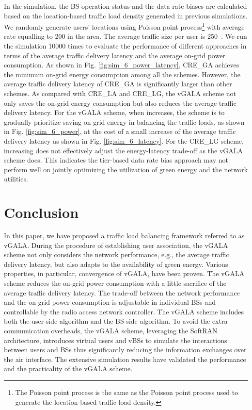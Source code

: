 \documentclass[journal]{IEEEtran}
\theoremstyle{definition}
\begin{document}
In the simulation, the BS operation status and the data rate biases are calculated based on the location-based traffic load density generated in previous simulations. We randomly generate users' locations using Poisson point process\footnote{The Poisson point process is the same as the Poisson point process used to generate the location-based traffic load density.} with average rate equalling to 200 in the area. The average traffic size per user is 250~. We run the simulation 10000 times to evaluate the performance of different approaches in terms of the average traffic delivery latency and the average on-grid power consumption. As shown in Fig. \ref{fig:sim_6_power_latency}, CRE\_GA achieves the minimum on-grid energy consumption among all the schemes. However, the average traffic delivery latency of CRE\_GA is significantly larger than other schemes. As compared with CRE\_LA and CRE\_LG, the vGALA scheme not only saves the on-grid energy consumption but also reduces the average traffic delivery latency. For the vGALA scheme, when  increases, the scheme is to gradually prioritize saving on-grid energy in balancing the traffic loads, as shown in Fig. \ref{fig:sim_6_power}, at the cost of a small increase of the average traffic delivery latency as shown in Fig. \ref{fig:sim_6_latency}. For the CRE\_LG scheme, increasing  does not effectively adjust the energy-latency trade-off as the vGALA scheme does. This indicates the tier-based data rate bias approach may not perform well on jointly optimizing the utilization of green energy and the network utilities.






\section{Conclusion}
\label{sec:conclusion}
In this paper, we have proposed a traffic load balancing framework referred to as vGALA. During the procedure of establishing user association, the vGALA scheme not only considers the network performance, e.g., the average traffic delivery latency, but also adapts to the availability of green energy. Various properties, in particular, convergence of vGALA, have been proven. The vGALA scheme reduces the on-grid power consumption with a little sacrifice of the average traffic delivery latency. The trade-off between the network performance and the on-grid power consumption is adjustable in individual BSs and controllable by the radio access network controller. The vGALA scheme includes both the user side algorithm and the BS side algorithm. To avoid the extra communication overheads, the vGALA scheme, leveraging the SoftRAN architecture, introduces virtual users and vBSs to simulate the interactions between users and BSs thus significantly reducing the information exchanges over the air interface. The extensive simulation results have validated the performance and the practicality of the vGALA scheme.
\end{document}
